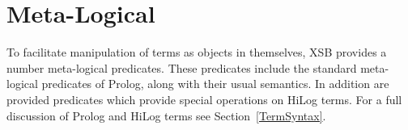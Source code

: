 

\section{Meta-Logical}\label{MetaLogical}

To facilitate manipulation of terms as objects in themselves,
XSB provides a number meta-logical predicates.  These
predicates include the standard meta-logical predicates of Prolog,
along with their usual semantics.  In addition are provided predicates
which provide special operations on HiLog terms.  For a full
discussion of Prolog and HiLog terms see Section~\ref{TermSyntax}.

